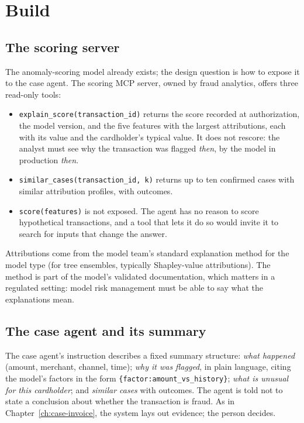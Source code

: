 
\section{Build}
\label{sec:fr-build}

\subsection{The scoring server}

The anomaly-scoring model already exists; the design question is how to expose it to the case agent. The scoring MCP server, owned by fraud analytics, offers three read-only tools:
\begin{itemize}[itemsep=1pt]
  \item \texttt{explain\_score(transaction\_id)} returns the score recorded at authorization, the model version, and the five features with the largest attributions, each with its value and the cardholder's typical value. It does not rescore: the analyst must see why the transaction was flagged \emph{then}, by the model in production \emph{then}.
  \item \texttt{similar\_cases(transaction\_id, k)} returns up to ten confirmed cases with similar attribution profiles, with outcomes.
  \item \texttt{score(features)} is not exposed. The agent has no reason to score hypothetical transactions, and a tool that lets it do so would invite it to search for inputs that change the answer.
\end{itemize}
Attributions come from the model team's standard explanation method for the model type (for tree ensembles, typically Shapley-value attributions). The method is part of the model's validated documentation, which matters in a regulated setting: model risk management must be able to say what the explanations mean.

\subsection{The case agent and its summary}

The case agent's instruction describes a fixed summary structure: \emph{what happened} (amount, merchant, channel, time); \emph{why it was flagged}, in plain language, citing the model's factors in the form \texttt{\{factor:amount\_vs\_history\}}; \emph{what is unusual for this cardholder}; and \emph{similar cases} with outcomes. The agent is told not to state a conclusion about whether the transaction is fraud. As in Chapter~\ref{ch:case-invoice}, the system lays out evidence; the person decides.

